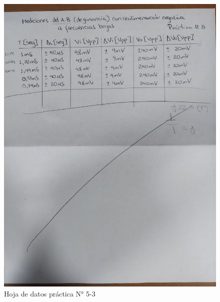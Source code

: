 \begin{figure}[ht]
    \centering
    \includegraphics[width=1.0\textwidth, angle=90]{src/images/p5/p5-hoja-de-datos-3.jpg}
    \caption{Hoja de datos práctica N° 5-3}
    \label{fig:hoja-de-datos-p5-3}
\end{figure}




